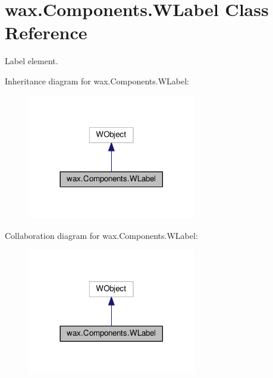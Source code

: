 \hypertarget{classwax_1_1Components_1_1WLabel}{}\section{wax.\+Components.\+W\+Label Class Reference}
\label{classwax_1_1Components_1_1WLabel}


Label element.  




Inheritance diagram for wax.\+Components.\+W\+Label\+:\nopagebreak
\begin{figure}[H]
\begin{center}
\leavevmode
\includegraphics[width=209pt]{classwax_1_1Components_1_1WLabel__inherit__graph}
\end{center}
\end{figure}


Collaboration diagram for wax.\+Components.\+W\+Label\+:\nopagebreak
\begin{figure}[H]
\begin{center}
\leavevmode
\includegraphics[width=209pt]{classwax_1_1Components_1_1WLabel__coll__graph}
\end{center}
\end{figure}
